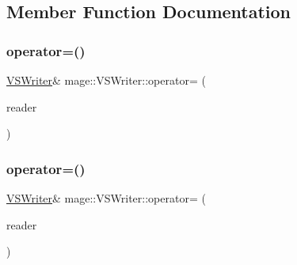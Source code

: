 \subsection{Member Function Documentation}
\hypertarget{classmage_1_1_v_s_writer_a3c961e3ef27f93b5ecf953c81844f6c6}{}\label{classmage_1_1_v_s_writer_a3c961e3ef27f93b5ecf953c81844f6c6} 
\subsubsection{\texorpdfstring{operator=()}{operator=()}\hspace{0.1cm}{\footnotesize\ttfamily [1/2]}}
{\footnotesize\ttfamily \hyperlink{classmage_1_1_v_s_writer}{V\+S\+Writer}\& mage\+::\+V\+S\+Writer\+::operator= (\begin{DoxyParamCaption}\item[{const \hyperlink{classmage_1_1_v_s_writer}{V\+S\+Writer} \&}]{reader }\end{DoxyParamCaption})\hspace{0.3cm}{\ttfamily [delete]}}

\hypertarget{classmage_1_1_v_s_writer_a33859922757212edae1010fce699e3af}{}\label{classmage_1_1_v_s_writer_a33859922757212edae1010fce699e3af} 
\subsubsection{\texorpdfstring{operator=()}{operator=()}\hspace{0.1cm}{\footnotesize\ttfamily [2/2]}}
{\footnotesize\ttfamily \hyperlink{classmage_1_1_v_s_writer}{V\+S\+Writer}\& mage\+::\+V\+S\+Writer\+::operator= (\begin{DoxyParamCaption}\item[{\hyperlink{classmage_1_1_v_s_writer}{V\+S\+Writer} \&\&}]{reader }\end{DoxyParamCaption})\hspace{0.3cm}{\ttfamily [delete]}}

\hypertarget{classmage_1_1_v_s_writer_a1d106607f69bbd5989a259bbf60262fb}{}\label{classmage_1_1_v_s_writer_a1d106607f69bbd5989a259bbf60262fb} 
